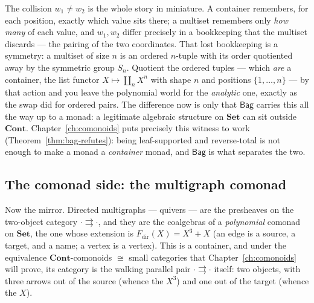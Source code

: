 \documentclass[11pt,a4paper]{book}
\newcommand{\Set}{\mathbf{Set}}
\newcommand{\Cont}{\mathbf{Cont}}
\theoremstyle{plain}
\theoremstyle{definition}
\theoremstyle{remark}
\begin{document}
The collision $w_{1}\neq w_{2}$ is the whole story in miniature. A container remembers, for
each position, exactly which value sits there; a multiset remembers only \emph{how many} of
each value, and $w_{1},w_{2}$ differ precisely in a bookkeeping that the multiset discards ---
the pairing of the two coordinates. That lost bookkeeping is a symmetry: a multiset of size
$n$ is an ordered $n$-tuple with its order quotiented away by the symmetric group $S_{n}$.
Quotient the ordered tuples --- which \emph{are} a container, the list functor
$X\mapsto\coprod_{n}X^{n}$ with shape $n$ and positions $\{1,\dots,n\}$ --- by that action
and you leave the polynomial world for the \emph{analytic} one, exactly as the swap did for
ordered pairs. The difference now is only
that $\mathsf{Bag}$ carries this all the way up to a monad: a legitimate algebraic structure
on $\Set$ can sit outside $\Cont$. Chapter~\ref{ch:comonoids} puts precisely this witness to
work (Theorem~\ref{thm:bag-refutes}): being leaf-supported and reverse-total is not enough to
make a monad a \emph{container} monad, and $\mathsf{Bag}$ is what separates the two.

\subsection*{The comonad side: the multigraph comonad}

Now the mirror. Directed multigraphs --- quivers --- are the presheaves on the two-object
category $\cdot\rightrightarrows\cdot$, and they are the coalgebras of a \emph{polynomial}
comonad on $\Set$, the one whose extension is $F_{\mathrm{dir}}(X)=X^{3}+X$ (an edge is a
source, a target, and a name; a vertex is a vertex). This is a container, and under the
equivalence $\Cont$-comonoids $\cong$ small categories that Chapter~\ref{ch:comonoids} will
prove, its category is the walking parallel pair $\cdot\rightrightarrows\cdot$ itself: two
objects, with three arrows out of the source (whence the $X^{3}$) and one out of the target
(whence the $X$).
\end{document}
